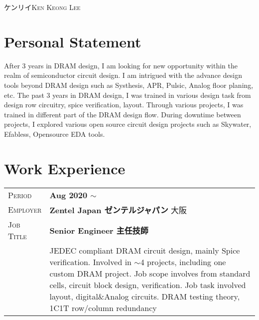 \documentclass[a4paper, oneside, final]{scrartcl} %
\newcommand{\gray}{\rowcolor[gray]{.90}} %
\begin{document}
\begin{center} %


{\fontsize{24}{12}\selectfont\scshape ケンリイKen Keong Lee } %

\vspace{0.2cm} %

\section{Personal Statement}

\footnotesize{After 3 years in DRAM design, I am looking for new opportunity within the realm of semiconductor circuit design. I am intrigued with the advance design tools beyond DRAM design such as Systhesis, APR, Pulsic, Analog floor planing, etc. The past 3 years in DRAM design, I was trained in various design task from design row circuitry, spice verification, layout. Through various projects, I was trained in different part of the DRAM design flow. During downtime between projects, I explored various open source circuit design projects such as Skywater, Efabless, Opensource EDA tools.}


\section{Work Experience}

\begin{tabularx}{0.97\linewidth}{>{\raggedleft\scshape}p{2cm}X}
\gray Period & \textbf{Aug 2020 $\sim$}\\
\gray Employer & \textbf{Zentel Japan ゼンテルジャパン} \hfill 大阪\\
\gray Job Title & \textbf{Senior Engineer 主任技師}\\
& \footnotesize{JEDEC compliant DRAM circuit design, mainly Spice verification. Involved in $\sim$4 projects, including one custom DRAM project. Job scope involves from standard cells, circuit block design, verification. Job task involved layout, digital\&Analog circuits. DRAM testing theory, 1C1T row/column redundancy}
\end{tabularx}


\end{center}
\end{document}
